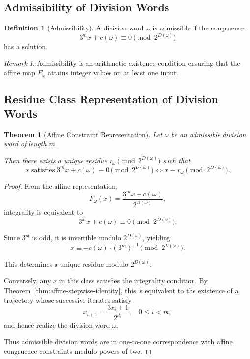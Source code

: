 \documentclass[12pt, oneside]{article}
\numberwithin{equation}{section}
\theoremstyle{definition}
\newtheorem{definition}{Definition}[section]
\theoremstyle{plain}
\newtheorem{theorem}{Theorem}[section]
\theoremstyle{remark}
\newtheorem*{remark}{Remark}
\begin{document}
\subsection{Admissibility of Division Words}

\begin{definition}[Admissibility]
\label{def:admissible-division-word}
A division word $\omega$ is admissible if the congruence
\[
3^m x + c(\omega) \equiv 0 \pmod{2^{D(\omega)}}
\]
has a solution.
\end{definition}

\begin{remark}
Admissibility is an arithmetic existence condition ensuring that the
affine map $F_\omega$ attains integer values on at least one input.
\end{remark}

\subsection{Residue Class Representation of Division Words}

\begin{theorem}[Affine Constraint Representation]
Let $\omega$ be an admissible division word of length $m$.

Then there exists a unique residue $r_\omega \pmod{2^{D(\omega)}}$ such that
\[
x \text{ satisfies } 3^m x + c(\omega) \equiv 0 \pmod{2^{D(\omega)}}
\iff
x \equiv r_\omega \pmod{2^{D(\omega)}}.
\]
\end{theorem}

\begin{proof}
From the affine representation,
\[
F_\omega(x) = \frac{3^m x + c(\omega)}{2^{D(\omega)}},
\]
integrality is equivalent to
\[
3^m x + c(\omega) \equiv 0 \pmod{2^{D(\omega)}}.
\]

Since $3^m$ is odd, it is invertible modulo $2^{D(\omega)}$, yielding
\[
x \equiv -c(\omega) \cdot (3^m)^{-1} \pmod{2^{D(\omega)}}.
\]

This determines a unique residue modulo $2^{D(\omega)}$.

Conversely, any $x$ in this class satisfies the integrality condition.
By Theorem~\ref{thm:affine-stepwise-identity}, this is equivalent to the
existence of a trajectory whose successive iterates satisfy
\[
x_{i+1} = \frac{3x_i+1}{2^{d_i}}, \quad 0 \le i < m,
\]
and hence realize the division word $\omega$.

Thus admissible division words are in one-to-one correspondence with affine
congruence constraints modulo powers of two.
\end{proof}
\end{document}
